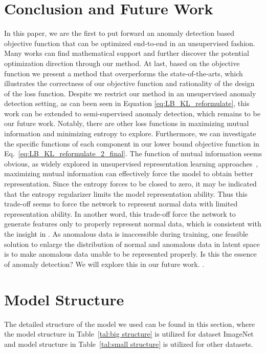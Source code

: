 \documentclass[journal]{IEEEtran}
\theoremstyle{remark}
\begin{document}
\section{Conclusion and Future Work}
In this paper, we are the first to put forward an anomaly detection based objective function that can be optimized end-to-end in an unsupervised fashion. Many works can find mathematical support and further discover the potential optimization direction through our method. At last, based on the objective function we present a method that overperforms the state-of-the-arts, which illustrates the correctness of our objective function and rationality of the design of the loss function.
Despite we restrict our method in an unsupervised anomaly detection setting, as can been seen in Equation \ref{eq:LB_KL_reformulate}, this work can be extended to semi-supervised anomaly detection, which remains to be our future work. Notably, there are other loss functions in maximizing mutual information and minimizing entropy to explore.
Furthermore, we can investigate the specific functions of each component in our lower bound objective function in Eq.~\ref{eq:LB_KL_reformulate_2_final}. The function of mutual information seems obvious, as widely explored in unsupervised representation learning approaches~\cite{CPC,DIM,AMDIM,SimCLR,MoCo1}, maximizing mutual information can effectively force the model to obtain better representation. Since the entropy forces  to be closed to zero, it may be indicated that the entropy regularizer limits the model representation ability. Thus this trade-off seems to force the network to represent normal data with limited representation ability. In another word, this trade-off force the network to generate features only to properly represent normal data, which is consistent with the insight in \cite{OCGAN}. As anomalous data is inaccessible during training, one feasible solution to enlarge the distribution of normal and anomalous data in latent space is to make anomalous data unable to be represented properly. Is this the essence of anomaly detection? We will explore this in our future work.
.
\ifCLASSOPTIONcaptionsoff
  \newpage
\fi





\clearpage

\appendices


\section{Model Structure}
The detailed structure of the model we used can be found in this section, where the model structure in Table~\ref{tal:big structure} is utilized for dataset ImageNet and model structure in Table~\ref{tal:small structure} is utilized for other datasets.
\end{document}
